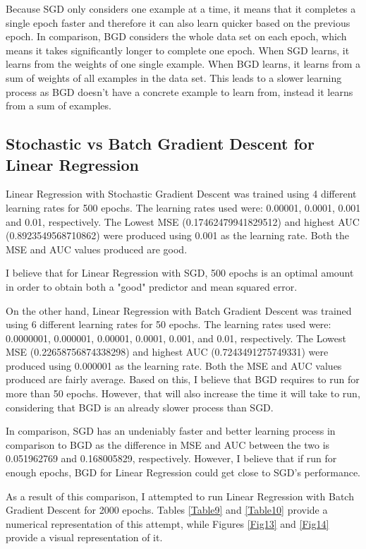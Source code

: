\documentclass{article} %
\begin{document}
Because SGD only considers one example at a time, it means that it completes a single epoch faster and therefore it can also learn quicker based on the previous epoch. In comparison, BGD considers the whole data set on each epoch, which means it takes significantly longer to complete one epoch. When SGD learns, it learns from the weights of one single example. When BGD learns, it learns from a sum of weights of all examples in the data set. This leads to a slower learning process as BGD doesn't have a concrete example to learn from, instead it learns from a sum of examples.

\subsection{Stochastic vs Batch Gradient Descent for Linear Regression}

Linear Regression with Stochastic Gradient Descent was trained using 4 different learning rates for 500 epochs. The learning rates used were: 0.00001, 0.0001, 0.001 and 0.01, respectively. The Lowest MSE (0.17462479941829512) and highest AUC (0.8923549568710862) were produced using 0.001 as the learning rate. Both the MSE and AUC values produced are good.

I believe that for Linear Regression with SGD, 500 epochs is an optimal amount in order to obtain both a "good" predictor and mean squared error.

On the other hand, Linear Regression with Batch Gradient Descent was trained using 6 different learning rates for 50 epochs. The learning rates used were: 0.0000001, 0.000001, 0.00001, 0.0001, 0.001, and 0.01, respectively. The Lowest MSE (0.22658756874338298) and highest AUC (0.7243491275749331) were produced using 0.000001 as the learning rate. Both the MSE and AUC values produced are fairly average. Based on this, I believe that BGD requires to run for more than 50 epochs. However, that will also increase the time it will take to run, considering that BGD is an already slower process than SGD.

In comparison, SGD has an undeniably faster and better learning process in comparison to BGD as the difference in MSE and AUC between the two is 0.051962769 and 0.168005829, respectively. However, I believe that if run for enough epochs, BGD for Linear Regression could get close to SGD's performance.

As a result of this comparison, I attempted to run Linear Regression with Batch Gradient Descent for 2000 epochs. Tables \ref{Table9} and \ref{Table10} provide a numerical representation of this attempt, while Figures \ref{Fig13} and \ref{Fig14} provide a visual representation of it.
\end{document}
